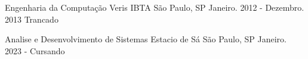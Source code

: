 

\begin{cventries}

  \cventry
    {Engenharia da Computação} %
    {Veris IBTA} %
    {São Paulo, SP} %
    {Janeiro. 2012 - Dezembro. 2013 \newline Trancado} %
    {
    }

\cventry
    {Analise e Desenvolvimento de Sistemas} %
    {Estacio de Sá} %
    {São Paulo, SP} %
    {Janeiro. 2023 - Cursando} %
    {
    }

\end{cventries}

